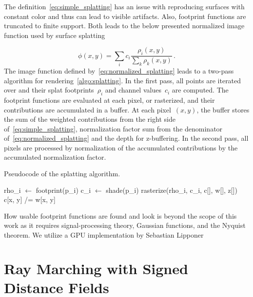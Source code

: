 The definition~\cref{eq:simple_splatting} has an issue with reproducing surfaces with constant color and thus can
lead to visible artifacts. Also, footprint functions are truncated to finite support. Both leads to the below presented
normalized image function used by surface splatting

\begin{equation}\label{eq:normalized_splatting}
\phi(x, y) = \sum_i c_i\frac{\rho_i(x, y)}{\sum_k \rho_k(x, y)}\,.
\end{equation}
The image function defined by~\cref{eq:normalized_splatting} leads to a two-pass algorithm for
rendering~\cref{algo:splatting}. In the first pass, all points are iterated over and their splat
footprints~$\rho_i$ and channel values~$c_i$ are computed. The footprint functions are evaluated at each pixel, or
rasterized, and their contributions are accumulated in a buffer. At each pixel~$(x, y)$,
the buffer stores the sum of the weighted contributions from the right side of~\cref{eq:simple_splatting},
normalization factor sum from the denominator of~\cref{eq:normalized_splatting} and the depth for z-buffering.
In the second pass, all pixels are processed by normalization of the accumulated contributions by the accumulated
normalization factor.

\begin{algorithm}
	\caption{Pseudocode of the splatting algorithm.}\label{algo:splatting}
	\begin{algorithmic}[1]
					\State rho\_i $\gets$ footprint(p\_i)
					\State c\_i $\gets$ shade(p\_i)
                        \State rasterize(rho\_i, c\_i, c[], w[], z[])
			\EndFor
                        \State c[x, y] /= w[x, y]
			\EndFor
		\EndProcedure
	\end{algorithmic}
\end{algorithm}

How usable footprint functions are found and look is beyond the scope of this work as it requires
signal-processing theory, Gaussian functions, and the Nyquist theorem. We utilize
a GPU implementation by Sebastian Lipponer

\section{Ray Marching with Signed Distance Fields}

